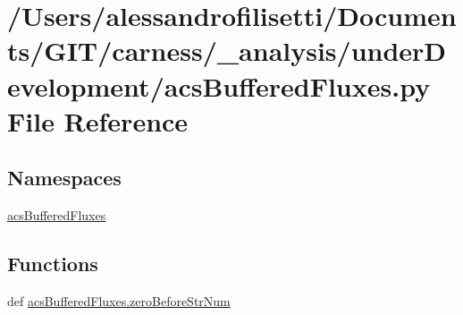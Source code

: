 \hypertarget{a00041}{\section{/\-Users/alessandrofilisetti/\-Documents/\-G\-I\-T/carness/\-\_\-analysis/under\-Development/acs\-Buffered\-Fluxes.py File Reference}
\label{a00041}
}
\subsection*{Namespaces}
\begin{DoxyCompactItemize}
\item 
\hyperlink{a00098}{acs\-Buffered\-Fluxes}
\end{DoxyCompactItemize}
\subsection*{Functions}
\begin{DoxyCompactItemize}
\item 
def \hyperlink{a00098_ad40fd27cb36a2086a2b8d0acadd4dbc9}{acs\-Buffered\-Fluxes.\-zero\-Before\-Str\-Num}
\end{DoxyCompactItemize}

